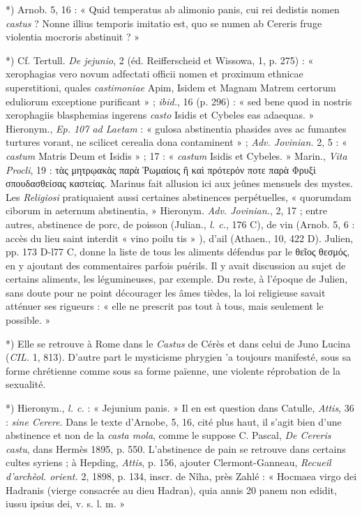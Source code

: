 \documentclass[a4paper, 11pt, oneside, polutonikogreek, french]{article}
\begin{document}
*) Arnob. 5, 16 : « Quid temperatus ab alimonio panis, cui rei dedistis nomen \emph{castus} ? Nonne illius temporis imitatio est, quo se numen ab Cereris fruge violentia mocroris abstinuit ? »

*) Cf. Tertull. \emph{De jejunio}, 2 (éd. Reifferscheid et Wissowa, 1, p. 275) : « xerophagias vero novum adfectati officii nomen et proximum ethnicae superstitioni, quales \emph{castimoniae} Apim, Isidem et Magnam Matrem certorum eduliorum exceptione purificant » ; \emph{ibid.}, 16 (p. 296) : « sed bene quod in nostris xerophagiis blasphemias ingerens \emph{casto} Isidis et Cybeles eas adaequas. » Hieronym., \emph{Ep. 107 ad Laetam} : « gulosa abstinentia phasides aves ac fumantes turtures vorant, ne scilicet cerealia dona contaminent » ; \emph{Adv. Jovinian.} 2, 5 : « \emph{castum} Matris Deum et Isidis » ; 17 : « \emph{castum} Isidis et Cybeles. » Marin., \emph{Vita Procli}, 19 : τὰς μητρῳακὰς παρὰ Ῥωμαίοις ἢ καὶ πρότερόν ποτε παρὰ Φρυξὶ σπουδασθείσας καστείας. Marinus fait allusion ici aux jeûnes mensuels des mystes. Les \emph{Religiosi} pratiquaient aussi certaines abstinences perpétuelles, « quorumdam ciborum in aeternum abstinentia, » Hieronym. \emph{Adv. Jovinian.}, 2, 17 ; entre autres, abstinence de porc, de poisson (Julian., \emph{l. c.}, 176 C), de vin (Arnob. 5, 6 : accès du lieu saint interdit « vino poilu tis » ), d'ail (Athaen., 10, 422 D). Julien, pp. 173 D-l77 C, donne la liste de tous les aliments défendus par le θεῖος θεσμός, en y ajoutant des commentaires parfois puérils. Il y avait discussion au sujet de certains aliments, les légumineuses, par exemple. Du reste, à l'époque de Julien, sans doute pour ne point décourager les âmes tièdes, la loi religieuse savait atténuer ses rigueurs : « elle ne prescrit pas tout à tous, mais seulement le possible. »

*) Elle se retrouve à Rome dans le \emph{Castus} de Cérès et dans celui de Juno Lucina (\emph{CIL.} 1, 813). D'autre part le mysticisme phrygien 'a toujours manifesté, sous sa forme chrétienne comme sous sa forme païenne, une violente réprobation de la sexualité.

*) Hieronym., \emph{l. c.} : « Jejunium panis. » Il en est question dans Catulle, \emph{Attis}, 36 : \emph{sine Cerere}. Dans le texte d'Arnobe, 5, 16, cité plus haut, il s'agit bien d'une abstinence et non de la \emph{casta mola}, comme le suppose C. Pascal, \emph{De Cereris castu}, dans Hermès 1895, p. 550. L'abstinence de pain se retrouve dans certains cultes syriens ; à Hepding, \emph{Attis}, p. 156, ajouter Clermont-Ganneau, \emph{Recueil d'archèol. orient.} 2, 1898, p. 134, inscr. de Nîha, près Zahlé : « Hocmaea virgo dei Hadranis (vierge consacrée au dieu Hadran), quia annis 20 panem non edidit, iussu ipsius dei, v. s. l. m. »
\end{document}
